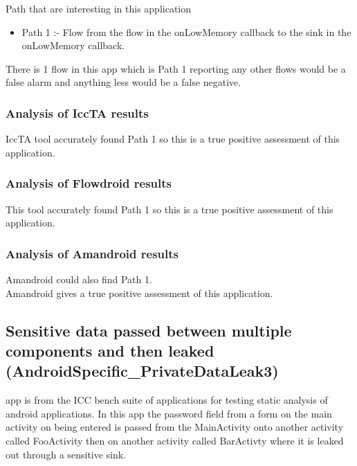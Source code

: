 \documentclass[journal]{IEEEtran}
\begin{document}
Path that are interesting in this application
\begin{itemize}
	\item Path 1 :-  Flow from the flow in the onLowMemory callback to the sink in the onLowMemory callback.
\end{itemize}

There is 1 flow in this app which is Path 1 reporting any other flows would be a false alarm and anything less would be a false negative. 

\subsubsection{Analysis of IccTA results}
IccTA tool accurately found Path 1 so this is a true positive assessment of this application.\\
\subsubsection{Analysis of Flowdroid results}
This tool accurately found Path 1 so this is a true positive assessment of this application.\\

\subsubsection{Analysis of Amandroid results}
Amandroid could also find Path 1.\\ Amandroid gives a true positive assessment of this application.

\subsection{Sensitive data passed between multiple components and then leaked (AndroidSpecific\_PrivateDataLeak3)}
% 
% 
% 
% 
 app is from the ICC bench suite of applications for testing static analysis of android applications. In this app the password field from a form on the main activity on being entered is passed from the MainActivity onto another activity called FooActivity then on another activity called BarActivty where it is leaked out through a sensitive sink.
\end{document}
